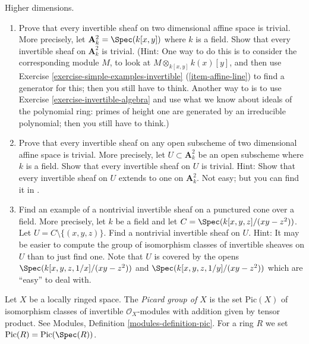 \begin{exercise}
\label{exercise-higher-dimension-invertible}
Higher dimensions.
\begin{enumerate}
\item Prove that every invertible sheaf on two dimensional
affine space is trivial. More precisely, let
${\mathbf A}^2_k = \Spec(k[x, y])$ where $k$ is a field.
Show that every invertible sheaf on ${\mathbf A}^2_k$ is trivial.
(Hint: One way to do this is to consider the corresponding
module $M$, to look at $M \otimes_{k[x, y]} k(x)[y]$, and
then use
Exercise \ref{exercise-simple-examples-invertible} (\ref{item-affine-line})
to find a generator for this; then you still have to think.
Another way to is to use
Exercise \ref{exercise-invertible-algebra}
and use what we know about ideals of the
polynomial ring: primes of height one are generated by an irreducible
polynomial; then you still have to think.)
\item Prove that every invertible sheaf on any open
subscheme of two dimensional affine space is trivial. More precisely, let
$U \subset {\mathbf A}^2_k$ be an open subscheme where $k$ is a field.
Show that every invertible sheaf on $U$ is trivial. Hint: Show that every
invertible sheaf on $U$ extends to one on ${\mathbf A}^2_k$. Not easy;
but you can find it in \cite{H}.
\item Find an example of a nontrivial
invertible sheaf on a punctured cone over a field. More
precisely, let $k$ be a field and let $C = \Spec(k[x, y, z]/(xy-z^2))$.
Let $U = C \setminus \{ (x, y, z) \}$. Find a nontrivial
invertible sheaf on $U$. Hint: It may be easier to compute the
group of isomorphism classes of invertible sheaves on $U$ than to
just find one. Note that $U$ is covered by the opens
$\Spec(k[x, y, z, 1/x]/(xy-z^2))$ and
$\Spec(k[x, y, z, 1/y]/(xy-z^2))$
which are ``easy'' to deal with.
\end{enumerate}
\end{exercise}

\begin{definition}
\label{definition-picard-group}
Let $X$ be a locally ringed space.
The {\it Picard group of $X$} is the set $\text{Pic}(X)$
of isomorphism classes of invertible $\mathcal{O}_X$-modules
with addition given by tensor product.
See Modules, Definition \ref{modules-definition-pic}.
For a ring $R$ we set $\text{Pic}(R) = \text{Pic}(\Spec(R))$.
\end{definition}

